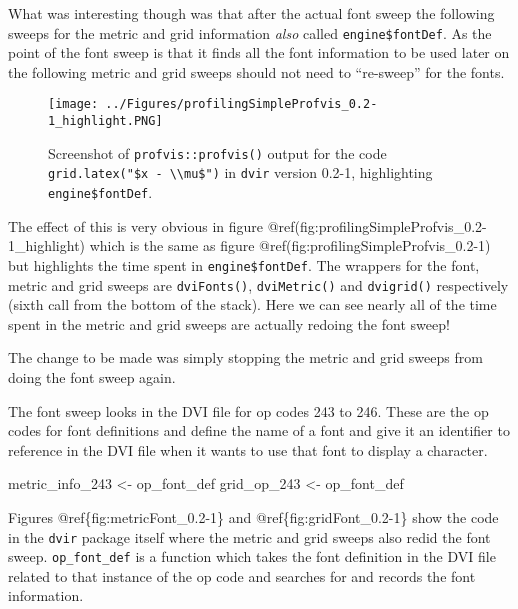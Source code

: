 \documentclass[]{article}
\newenvironment{Shaded}{\begin{snugshade}}{\end{snugshade}}
\newcommand{\DecValTok}[1]{\textcolor[rgb]{0.00,0.00,0.81}{#1}}
\newcommand{\StringTok}[1]{\textcolor[rgb]{0.31,0.60,0.02}{#1}}
\newcommand{\NormalTok}[1]{#1}
\begin{document}
What was interesting though was that after the actual font sweep the
following sweeps for the metric and grid information \emph{also} called
\texttt{engine\$fontDef}. As the point of the font sweep is that it
finds all the font information to be used later on the following metric
and grid sweeps should not need to ``re-sweep'' for the fonts.

\begin{figure}
\centering
\texttt{[image: ../Figures/profilingSimpleProfvis\_0.2-1\_highlight.PNG]}
\caption{Screenshot of \texttt{profvis::profvis()} output for the code
\texttt{grid.latex("\$x\ -\ \textbackslash{}\textbackslash{}mu\$")} in
\texttt{dvir} version 0.2-1, highlighting \texttt{engine\$fontDef}.}
\end{figure}

The effect of this is very obvious in figure
@ref(fig:profilingSimpleProfvis\_0.2-1\_highlight) which is the same as
figure @ref(fig:profilingSimpleProfvis\_0.2-1) but highlights the time
spent in \texttt{engine\$fontDef}. The wrappers for the font, metric and
grid sweeps are \texttt{dviFonts()}, \texttt{dviMetric()} and
\texttt{dvigrid()} respectively (sixth call from the bottom of the
stack). Here we can see nearly all of the time spent in the metric and
grid sweeps are actually redoing the font sweep!

The change to be made was simply stopping the metric and grid sweeps
from doing the font sweep again.

The font sweep looks in the DVI file for op codes 243 to 246. These are
the op codes for font definitions and define the name of a font and give
it an identifier to reference in the DVI file when it wants to use that
font to display a character.

\begin{Shaded}
\begin{Highlighting}[]
\NormalTok{metric_info_}\DecValTok{243}\NormalTok{ <-}\StringTok{ }\NormalTok{op_font_def}
\NormalTok{grid_op_}\DecValTok{243}\NormalTok{ <-}\StringTok{ }\NormalTok{op_font_def}
\end{Highlighting}
\end{Shaded}

Figures @ref\{fig:metricFont\_0.2-1\} and @ref\{fig:gridFont\_0.2-1\}
show the code in the \texttt{dvir} package itself where the metric and
grid sweeps also redid the font sweep. \texttt{op\_font\_def} is a
function which takes the font definition in the DVI file related to that
instance of the op code and searches for and records the font
information.
\end{document}

